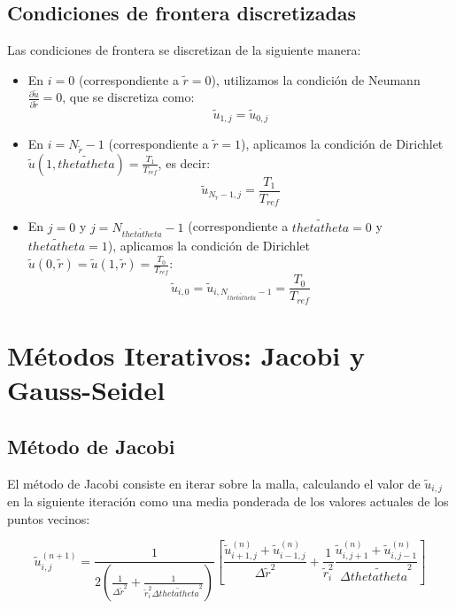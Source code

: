 \subsection{Condiciones de frontera discretizadas}

Las condiciones de frontera se discretizan de la siguiente manera:

\begin{itemize}
    \item En \(i = 0\) (correspondiente a \(\tilde{r} = 0\)), utilizamos la condición de Neumann \( \frac{\partial \tilde{u}}{\partial \tilde{r}} = 0 \), que se discretiza como:
    \[
    \tilde{u}_{1,j} = \tilde{u}_{0,j}
    \]
    \item En \(i = N_{\tilde{r}} - 1\) (correspondiente a \(\tilde{r} = 1\)), aplicamos la condición de Dirichlet \( \tilde{u}(1, \tilde{thetatheta}) = \frac{T_1}{T_{ref}} \), es decir:
    \[
    \tilde{u}_{N_{\tilde{r}}-1,j} = \frac{T_1}{T_{ref}}
    \]
    \item En \(j = 0\) y \(j = N_{\tilde{thetatheta}} - 1\) (correspondiente a \(\tilde{thetatheta} = 0\) y \(\tilde{thetatheta} = 1\)), aplicamos la condición de Dirichlet \( \tilde{u}(0, \tilde{r}) = \tilde{u}(1, \tilde{r}) = \frac{T_0}{T_{ref}} \):
    \[
    \tilde{u}_{i,0} = \tilde{u}_{i,N_{\tilde{thetatheta}}-1} = \frac{T_0}{T_{ref}}
    \]
\end{itemize}


\section{Métodos Iterativos: Jacobi y Gauss-Seidel}

\subsection{Método de Jacobi}

El método de Jacobi consiste en iterar sobre la malla, calculando el valor de \( \tilde{u}_{i,j} \) en la siguiente iteración como una media ponderada de los valores actuales de los puntos vecinos:

\begin{equation}
    \tilde{u}_{i,j}^{(n+1)} = \frac{1}{2 \left(\frac{1}{\Delta \tilde{r}^2} + \frac{1}{\tilde{r}_i^2 \Delta \tilde{thetatheta}^2}\right)} 
    \left[ \frac{\tilde{u}_{i+1,j}^{(n)} + \tilde{u}_{i-1,j}^{(n)}}{\Delta \tilde{r}^2} 
    + \frac{1}{\tilde{r}_i^2} \frac{\tilde{u}_{i,j+1}^{(n)} + \tilde{u}_{i,j-1}^{(n)}}{\Delta \tilde{thetatheta}^2} \right]
\end{equation}

